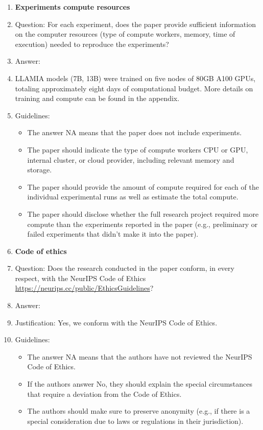 \documentclass{article}
\theoremstyle{plain}
\theoremstyle{definition}
\theoremstyle{remark}
\begin{document}
\begin{enumerate}
\item {\bf Experiments compute resources}
    \item[] Question: For each experiment, does the paper provide sufficient information on the computer resources (type of compute workers, memory, time of execution) needed to reproduce the experiments?
    \item[] Answer: \answerYes{} %
    \item[] LLAMIA models (7B, 13B) were trained on five nodes of 80GB A100 GPUs, totaling approximately eight days of computational budget. More details on training and compute can be found in the appendix.
    \item[] Guidelines:
    \begin{itemize}
        \item The answer NA means that the paper does not include experiments.
        \item The paper should indicate the type of compute workers CPU or GPU, internal cluster, or cloud provider, including relevant memory and storage.
        \item The paper should provide the amount of compute required for each of the individual experimental runs as well as estimate the total compute. 
        \item The paper should disclose whether the full research project required more compute than the experiments reported in the paper (e.g., preliminary or failed experiments that didn't make it into the paper). 
    \end{itemize}
    
\item {\bf Code of ethics}
    \item[] Question: Does the research conducted in the paper conform, in every respect, with the NeurIPS Code of Ethics \url{https://neurips.cc/public/EthicsGuidelines}?
    \item[] Answer: \answerYes{} %
    \item[] Justification: Yes, we conform with the NeurIPS Code of Ethics.
    \item[] Guidelines:
    \begin{itemize}
        \item The answer NA means that the authors have not reviewed the NeurIPS Code of Ethics.
        \item If the authors answer No, they should explain the special circumstances that require a deviation from the Code of Ethics.
        \item The authors should make sure to preserve anonymity (e.g., if there is a special consideration due to laws or regulations in their jurisdiction).
    \end{itemize}



\end{enumerate}
\end{document}
